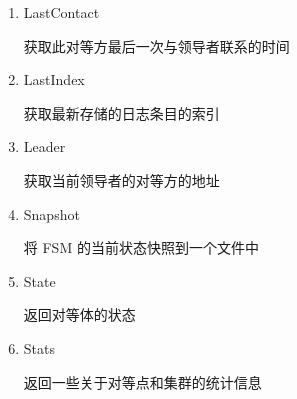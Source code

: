 \begin{enumerate}
\begin{enumerate}
				\item LastContact 
				
				获取此对等方最后一次与领导者联系的时间
			
				\item LastIndex	
				
				获取最新存储的日志条目的索引
				
				\item Leader 
				
				获取当前领导者的对等方的地址
			
				\item Snapshot 
				
				将 FSM 的当前状态快照到一个文件中
			
				\item State
				
				返回对等体的状态
			
				\item Stats 
				
				返回一些关于对等点和集群的统计信息

			\end{enumerate}

		\end{enumerate}

